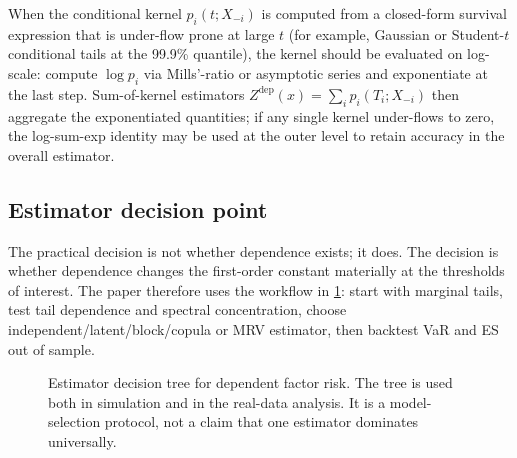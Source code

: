 \begin{remark}
\label{rem:numerical-stability}
When the conditional kernel $p_i(t;X_{-i})$ is computed from a closed-form
survival expression that is under-flow prone at large $t$ (for example,
Gaussian or Student-$t$ conditional tails at the 99.9\% quantile), the kernel
should be evaluated on log-scale: compute $\log p_i$ via Mills'-ratio or
asymptotic series and exponentiate at the last step. Sum-of-kernel estimators
$Z^{\mathrm{dep}}(x)=\sum_i p_i(T_i;X_{-i})$ then aggregate the
exponentiated quantities; if any single kernel under-flows to zero, the
log-sum-exp identity may be used at the outer level to retain accuracy in the
overall estimator.
\end{remark}

\subsection{Estimator decision point}

The practical decision is not whether dependence exists; it does. The decision
is whether dependence changes the first-order constant materially at the
thresholds of interest. The paper therefore uses the workflow in
\cref{fig:estimator-decision-tree}: start with marginal tails, test tail
dependence and spectral concentration, choose independent/latent/block/copula
or MRV estimator, then backtest VaR and ES out of sample.

\begin{figure}[t]
\centering

\caption[Estimator decision tree]{Estimator decision tree for dependent factor
risk. The tree is used both in simulation and in the real-data analysis. It is a
model-selection protocol, not a claim that one estimator dominates universally.}
\label{fig:estimator-decision-tree}
\end{figure}
